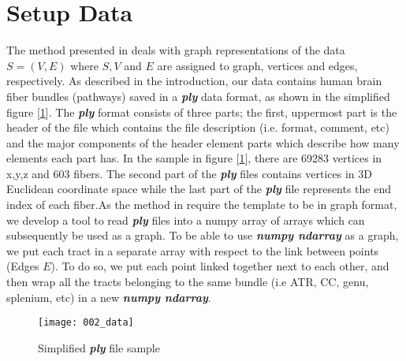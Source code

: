 \documentclass[../structure.tex]{subfiles}
\begin{document}
\section{Setup Data}
The method presented in \cite{Amberg2007} deals with graph representations of the data $S=(V,E)$ where $S,V$ and $E$ are assigned to graph, vertices and edges, respectively. As described in the introduction, our data contains human brain fiber bundles (pathways) saved in a \textbf{\textit{ply}} data format, as shown in the simplified figure [\ref{fig:data}]. The \textbf{\textit{ply}} format consists of three parts; the first, uppermost part is the header of the file which contains the file description (i.e. format, comment, etc) and the major components of the header element parts which describe how many elements each part has. In the sample in figure [\ref{fig:data}], there are 69283 vertices in x,y,z and 603 fibers. The second part of the \textbf{\textit{ply}} files contains vertices in 3D Euclidean coordinate space while the last part of the \textbf{\textit{ply}} file represents the end index of each fiber.As the method in \cite{Amberg2007} require the template to be in graph format, we develop a tool to read \textbf{\textit{ply}} files into a numpy array of arrays which can subsequently be used as a graph. To be able to use \textbf{\textit{numpy ndarray}} as a graph, we put each tract in a separate array with respect to the link between points (Edges $E$). To do so, we put each point linked together next to each other, and then wrap all the tracts belonging to the same bundle (i.e ATR, CC, genu, splenium, etc) in a new \textbf{\textit{numpy ndarray}}.

\begin{figure}[h!]
\centering
\texttt{[image: 002\_data]}
\captionsetup{justification=centering}
\caption{Simplified \textbf{\textit{ply}} file sample}
\label{fig:data}
\end{figure}
\end{document}
